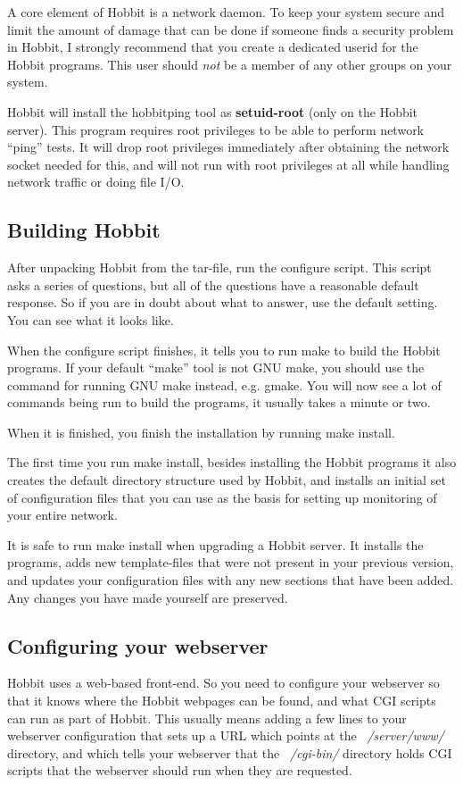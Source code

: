  A core element of Hobbit is a network daemon. To keep your system secure and limit the amount of damage that can be done if someone finds a security problem in Hobbit, I strongly recommend that you create a dedicated userid for the Hobbit programs. This user should \emph{not}
 be a member of any other groups on your system.


 Hobbit will install the hobbitping tool as \textbf{setuid-root}
(only on the Hobbit server). This program requires root privileges to be able to perform network ``ping'' tests. It will drop root privileges immediately after obtaining the network socket needed for this, and will not run with root privileges at all while handling network traffic or doing file I/O. 
\subsection{Building Hobbit}


 After unpacking Hobbit from the tar-file, run the configure script. This script asks a series of questions, but all of the questions have a reasonable default response. So if you are in doubt about what to answer, use the default setting. You can see what it looks like.


 When the configure script finishes, it tells you to run make to build the Hobbit programs. If your default ``make'' tool is not GNU make, you should use the command for running GNU make instead, e.g. gmake. You will now see a lot of commands being run to build the programs, it usually takes a minute or two.


 When it is finished, you finish the installation by running make install.


 The first time you run make install, besides installing the Hobbit programs it also creates the default directory structure used by Hobbit, and installs an initial set of configuration files that you can use as the basis for setting up monitoring of your entire network.


 It is safe to run make install when upgrading a Hobbit server. It installs the programs, adds new template-files that were not present in your previous version, and updates your configuration files with any new sections that have been added. Any changes you have made yourself are preserved.
\subsection{Configuring your webserver}


 Hobbit uses a web-based front-end. So you need to configure your webserver so that it knows where the Hobbit webpages can be found, and what CGI scripts can run as part of Hobbit. This usually means adding a few lines to your webserver configuration that sets up a URL which points at the \emph{~/server/www/}
 directory, and which tells your webserver that the \emph{~/cgi-bin/}
 directory holds CGI scripts that the webserver should run when they are requested.


